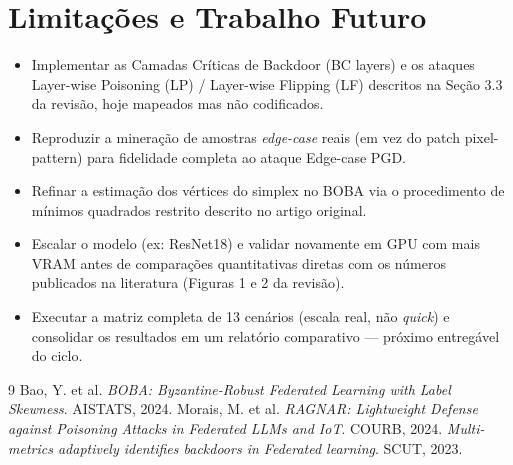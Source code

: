 \documentclass[11pt,a4paper]{article}
\begin{document}
\section{Limitações e Trabalho Futuro}
\begin{itemize}
\item Implementar as Camadas Críticas de Backdoor (BC layers) e os ataques Layer-wise Poisoning (LP) /
  Layer-wise Flipping (LF) descritos na Seção 3.3 da revisão, hoje mapeados mas não codificados.
\item Reproduzir a mineração de amostras \textit{edge-case} reais (em vez do patch pixel-pattern) para
  fidelidade completa ao ataque Edge-case PGD.
\item Refinar a estimação dos vértices do simplex no BOBA via o procedimento de mínimos quadrados
  restrito descrito no artigo original.
\item Escalar o modelo (ex: ResNet18) e validar novamente em GPU com mais VRAM antes de comparações
  quantitativas diretas com os números publicados na literatura (Figuras 1 e 2 da revisão).
\item Executar a matriz completa de 13 cenários (escala real, não \textit{quick}) e consolidar os
  resultados em um relatório comparativo — próximo entregável do ciclo.
\end{itemize}

\begin{thebibliography}{9}
 Bao, Y. et al. \textit{BOBA: Byzantine-Robust Federated Learning with Label Skewness}. AISTATS, 2024.
 Morais, M. et al. \textit{RAGNAR: Lightweight Defense against Poisoning Attacks in Federated LLMs and IoT}. COURB, 2024.
 \textit{Multi-metrics adaptively identifies backdoors in Federated learning}. SCUT, 2023.
\end{thebibliography}
\end{document}

